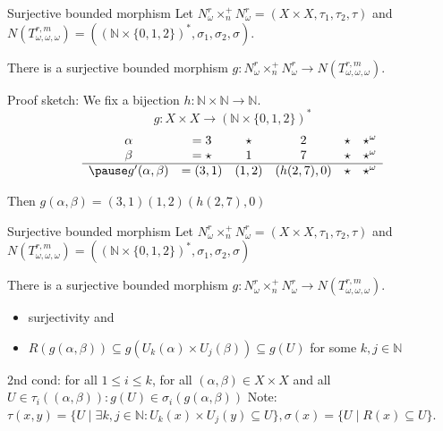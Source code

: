 \begin{frame}[t]{Surjective bounded morphism}
	Let $N_\omega^r \times_n^+ N_\omega^r = (X \times X, \tau_1, \tau_2, \tau)$ and $N(T_{\omega,\omega,\omega}^{r,m}) = ((\mathbb{N} \times \{0,1,2\})^*, \sigma_1, \sigma_2, \sigma)$.
	\begin{theorem}
	There is a surjective bounded morphism $g: N_\omega^r \times_n^+ N_\omega^r \to N(T_{\omega,\omega,\omega}^{r,m})$. 
	\end{theorem}
	Proof sketch: We fix a bijection $h: \mathbb{N} \times \mathbb{N} \to \mathbb{N} $. \pause
			\[
				g: X \times X \to (\mathbb{N} \times \{0,1,2\})^* 
		\] \pause
\vspace{-0.4cm}
			\[
\begin{array}{cccccc}
\alpha &= 3 & \star & 2 & \star & \star^\omega\\
\beta  &= \star     & 1& 7 & \star & \star^\omega\\
\hline \pause
g'(\alpha,\beta) &= (3,1) & (1,2) & (h(2,7),0) & \star & \star^\omega
\end{array}
\]
 \pause


Then $g(\alpha,\beta) = (3,1)(1,2) (h(2,7),0)$

	
\end{frame}





\begin{frame}{Surjective bounded morphism}
	Let $N_\omega^r \times_n^+ N_\omega^r = (X \times X, \tau_1, \tau_2, \tau)$ and $N(T_{\omega,\omega,\omega}^{r,m}) = ((\mathbb{N} \times \{0,1,2\})^*, \sigma_1, \sigma_2, \sigma)$ 
	\begin{theorem}
		
		There is a surjective bounded morphism $g: N_\omega^r \times_n^+ N_\omega^r \to N(T_{\omega,\omega,\omega}^{r,m})$.

		
	\end{theorem}
	\begin{itemize}
		\item surjectivity and 
		\item $R(g(\alpha,\beta)) \subseteq g(U_k(\alpha) \times U_j(\beta)) \subseteq g(U)$ for some $k,j \in \mathbb{N}$
	\end{itemize}
		\vspace{1cm}
	    {

   		2nd cond: for all $1 \le i \le k$, for all $(\alpha,\beta) \in X \times X$ and all $U \in \tau_i((\alpha,\beta)): g(U) \in \sigma_i(g(\alpha,\beta))$ \newline
			Note: $\tau(x,y) = \{U \mid \exists k,j \in \mathbb{N}: U_k(x) \times U_j(y) \subseteq U\}, \sigma(x) = \{U \mid R(x) \subseteq U\}$.

			
    	}

\end{frame}

